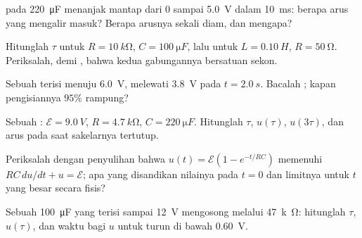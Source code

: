 \begin{exercise}[$\star$]\label{exo:g12:rc-rl-circuits:3}
 pada  \qty{220}{\micro F} menanjak mantap dari $0$
sampai \qty{5.0}{V} dalam \qty{10}{ms}: berapa arus yang mengalir masuk? Berapa arusnya sekali
 diam, dan mengapa?
\end{exercise}

\begin{exercise}[$\star$]\label{exo:g12:rc-rl-circuits:4}
Hitunglah $\tau$ untuk $R = \qty{10}{k\ohm}$, $C = \qty{100}{\micro F}$, lalu
untuk $L = \qty{0.10}{H}$, $R = \qty{50}{\ohm}$. Periksalah,  demi , bahwa
kedua gabungannya bersatuan sekon.
\end{exercise}

\begin{exercise}[$\star$]\label{exo:g12:rc-rl-circuits:5}
Sebuah  terisi menuju \qty{6.0}{V}, melewati \qty{3.8}{V} pada
$t = \qty{2.0}{s}$. Bacalah ; kapan pengisiannya $95\%$ rampung?
\end{exercise}

\begin{exercise}[$\star\star$]\label{exo:g12:rc-rl-circuits:6}
Sebuah : $\mathcal{E} = \qty{9.0}{V}$, $R = \qty{4.7}{k\ohm}$,
$C = \qty{220}{\micro F}$. Hitunglah $\tau$, $u(\tau)$, $u(3\tau)$, dan
arus pada saat sakelarnya tertutup.
\end{exercise}

\begin{exercise}[$\star\star$]\label{exo:g12:rc-rl-circuits:7}
Periksalah dengan penyulihan bahwa $u(t) = \mathcal{E}(1 - e^{-t/RC})$
memenuhi $RC\,du/dt + u = \mathcal{E}$; apa yang disandikan nilainya pada $t = 0$
dan limitnya untuk $t$ yang besar secara fisis?
\end{exercise}

\begin{exercise}[$\star\star$]\label{exo:g12:rc-rl-circuits:8}
Sebuah  \qty{100}{\micro F} yang terisi sampai \qty{12}{V} mengosong melalui
\qty{47}{k\ohm}: hitunglah $\tau$, $u(\tau)$, dan waktu bagi $u$ untuk turun
di bawah \qty{0.60}{V}.
\end{exercise}

